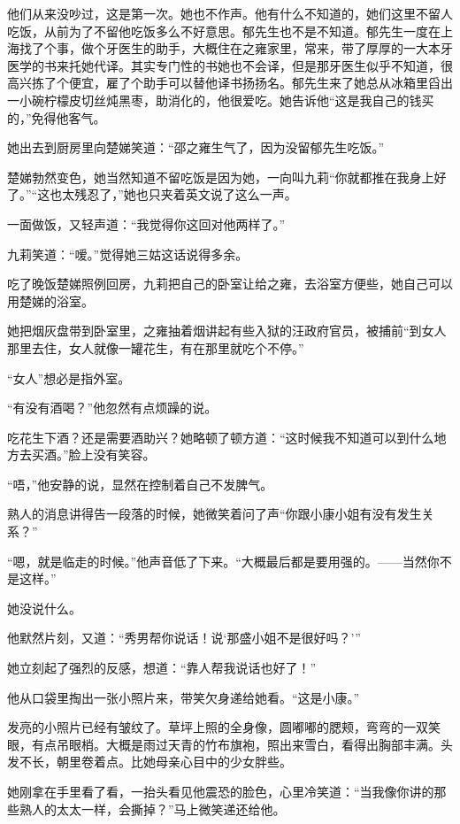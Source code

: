 \par 他们从来没吵过，这是第一次。她也不作声。他有什么不知道的，她们这里不留人吃饭，从前为了不留他吃饭多么不好意思。郁先生也不是不知道。郁先生一度在上海找了个事，做个牙医生的助手，大概住在之雍家里，常来，带了厚厚的一大本牙医学的书来托她代译。其实专门性的书她也不会译，但是那牙医生似乎不知道，很高兴拣了个便宜，雇了个助手可以替他译书扬扬名。郁先生来了她总从冰箱里舀出一小碗柠檬皮切丝炖黑枣，助消化的，他很爱吃。她告诉他“这是我自己的钱买的，”免得他客气。
\par 她出去到厨房里向楚娣笑道：“邵之雍生气了，因为没留郁先生吃饭。”
\par 楚娣勃然变色，她当然知道不留吃饭是因为她，一向叫九莉“你就都推在我身上好了。”“这也太残忍了，”她也只夹着英文说了这么一声。
\par 一面做饭，又轻声道：“我觉得你这回对他两样了。”
\par 九莉笑道：“嗳。”觉得她三姑这话说得多余。
\par 吃了晚饭楚娣照例回房，九莉把自己的卧室让给之雍，去浴室方便些，她自己可以用楚娣的浴室。
\par 她把烟灰盘带到卧室里，之雍抽着烟讲起有些入狱的汪政府官员，被捕前“到女人那里去住，女人就像一罐花生，有在那里就吃个不停。”
\par “女人”想必是指外室。
\par “有没有酒喝？”他忽然有点烦躁的说。
\par 吃花生下酒？还是需要酒助兴？她略顿了顿方道：“这时候我不知道可以到什么地方去买酒。”脸上没有笑容。
\par “唔，”他安静的说，显然在控制着自己不发脾气。
\par 熟人的消息讲得告一段落的时候，她微笑着问了声“你跟小康小姐有没有发生关系？”
\par “嗯，就是临走的时候。”他声音低了下来。“大概最后都是要用强的。——当然你不是这样。”
\par 她没说什么。
\par 他默然片刻，又道：“秀男帮你说话！说‘那盛小姐不是很好吗？'”
\par 她立刻起了强烈的反感，想道：“靠人帮我说话也好了！”
\par 他从口袋里掏出一张小照片来，带笑欠身递给她看。“这是小康。”
\par 发亮的小照片已经有皱纹了。草坪上照的全身像，圆嘟嘟的腮颊，弯弯的一双笑眼，有点吊眼梢。大概是雨过天青的竹布旗袍，照出来雪白，看得出胸部丰满。头发不长，朝里卷着点。比她母亲心目中的少女胖些。
\par 她刚拿在手里看了看，一抬头看见他震恐的脸色，心里冷笑道：“当我像你讲的那些熟人的太太一样，会撕掉？”马上微笑递还给他。
